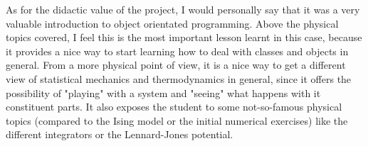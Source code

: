 \documentclass[11pt,a4paper,oneside]{article}
\begin{document}
		As for the didactic value of the project, I would personally say that it was a very valuable introduction to object orientated programming. Above the physical topics covered, I feel this is the most important lesson learnt in this case, because it provides a nice way to start learning how to deal with classes and objects in general. From a more physical point of view, it is a nice way to get a different view of statistical mechanics and thermodynamics in general, since it offers the possibility of "playing" with a system and "seeing" what happens with it constituent parts. It also exposes the student to some not-so-famous physical topics (compared to the Ising model or the initial numerical exercises) like the different integrators or the Lennard-Jones potential.\\
	
	
	
		
\end{document}
